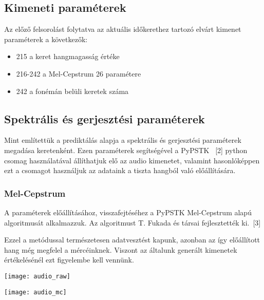 \subsection{Kimeneti paraméterek}
Az előző felsorolást folytatva az aktuális időkerethez tartozó elvárt kimenet paraméterek a következők:

 
\begin{itemize}
	\item 215 a keret hangmagasság értéke
	\item 216-242 a Mel-Cepstrum 26 paramétere
	\item 242 a fonémán belüli keretek száma
\end{itemize}
\subsection{Spektrális és gerjesztési paraméterek}
Mint említettük a prediktálás alapja a spektrális és gerjesztési paraméterek megadása keretenként. Ezen paraméterek segítségével a PyPSTK \ [2] python csomag használatával állíthatjuk elő az audio kimenetet, valamint hasonlóképpen ezt a csomagot használjuk az adataink a tiszta hangból való előállítására.
\subsubsection{Mel-Cepstrum}
A paraméterek előállításához, visszafejtéséhez a PyPSTK Mel-Cepstrum alapú algoritmusát alkalmazzuk. Az algoritmust T. Fukada és társai fejlesztették ki.\ [3]


Ezzel a metódussal természetesen adatvesztést kapunk, azonban az így előállított hang még megfelel a mércéinknek. Viszont az általunk generált kimenetek értékelésénél ezt figyelembe kell vennünk.

\texttt{[image: audio\_raw]}

\texttt{[image: audio\_mc]}